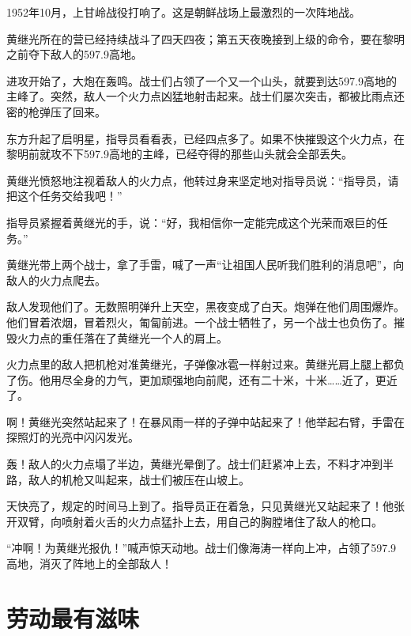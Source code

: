 \documentclass[12pt,UTF-8,openany]{ctexbook}
\begin{document}
\begin{large}
    
    1952年10月，上甘岭战役打响了。这是朝鲜战场上最激烈的一次阵地战。
    
    黄继光所在的营已经持续战斗了四天四夜；第五天夜晚接到上级的命令，要在黎明之前夺下敌人的597.9高地。
    
    进攻开始了，大炮在轰鸣。战士们占领了一个又一个山头，就要到达597.9高地的主峰了。突然，敌人一个火力点凶猛地射击起来。战士们屡次突击，都被比雨点还密的枪弹压了回来。
    
    东方升起了启明星，指导员看看表，已经四点多了。如果不快摧毁这个火力点，在黎明前就攻不下597.9高地的主峰，已经夺得的那些山头就会全部丢失。
    
    黄继光愤怒地注视着敌人的火力点，他转过身来坚定地对指导员说：“指导员，请把这个任务交给我吧！”
    
    指导员紧握着黄继光的手，说：“好，我相信你一定能完成这个光荣而艰巨的任务。”
    
    黄继光带上两个战士，拿了手雷，喊了一声“让祖国人民听我们胜利的消息吧”，向敌人的火力点爬去。
    
    敌人发现他们了。无数照明弹升上天空，黑夜变成了白天。炮弹在他们周围爆炸。他们冒着浓烟，冒着烈火，匍匐前进。一个战士牺牲了，另一个战士也负伤了。摧毁火力点的重任落在了黄继光一个人的肩上。
    
    火力点里的敌人把机枪对准黄继光，子弹像冰雹一样射过来。黄继光肩上腿上都负了伤。他用尽全身的力气，更加顽强地向前爬，还有二十米，十米……近了，更近了。
    
    啊！黄继光突然站起来了！在暴风雨一样的子弹中站起来了！他举起右臂，手雷在探照灯的光亮中闪闪发光。
    
    轰！敌人的火力点塌了半边，黄继光晕倒了。战士们赶紧冲上去，不料才冲到半路，敌人的机枪又叫起来，战士们被压在山坡上。
    
    天快亮了，规定的时间马上到了。指导员正在着急，只见黄继光又站起来了！他张开双臂，向喷射着火舌的火力点猛扑上去，用自己的胸膛堵住了敌人的枪口。
    
    “冲啊！为黄继光报仇！”喊声惊天动地。战士们像海涛一样向上冲，占领了597.9高地，消灭了阵地上的全部敌人！
    
\end{large}



\chapter{劳动最有滋味}
\end{document}
